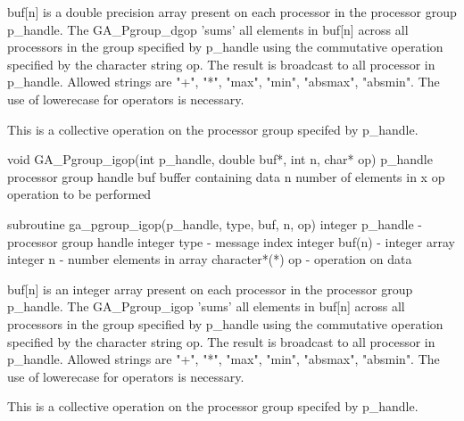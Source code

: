 \documentclass[12pt]{article}
\begin{document}
\begin{desc}

buf[n] is a double precision array present on each processor in the processor group p_handle. The GA_Pgroup_dgop 'sums' all elements in buf[n] across all processors in the group specified by p_handle using the commutative operation specified by the character string op.  The result is broadcast to all processor in p_handle. Allowed strings are "+", "*", "max", "min", "absmax", "absmin". The use of lowerecase for operators is necessary.

This is a collective operation on the processor group specifed by p_handle. 
\end{desc}


\begin{capi}
void GA_Pgroup_igop(int p_handle, double buf*, int n, char* op)
   p_handle                  processor group handle            \access{[input]} 
   buf                       buffer containing data             
   n                         number of elements in x           \access{[input]} 
   op                        operation to be performed         \access{[input]} 
\end{capi}
\begin{fapi}
subroutine ga_pgroup_igop(p_handle, type, buf, n, op)
   integer p_handle          - processor group handle      \access{[input]} 
   integer type              - message index               \access{[input]} 
   integer buf(n)            - integer array                
   integer n                 - number elements in array    \access{[input]} 
   character*(*) op          - operation on data           \access{[input]} 
\end{fapi}

\begin{desc}

buf[n] is an integer array present on each processor in the processor group p_handle. The GA_Pgroup_igop 'sums' all elements in buf[n] across all processors in the group specified by p_handle using the commutative operation specified by the character string op.  The result is broadcast to all processor in p_handle. Allowed strings are "+", "*", "max", "min", "absmax", "absmin". The use of lowerecase for operators is necessary.

This is a collective operation on the processor group specifed by p_handle. 
\end{desc}
\end{document}
